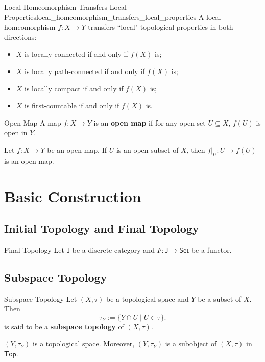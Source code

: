 \documentclass{report}
\newcommand{\Top}{\mathsf{Top}}
\begin{document}
\begin{proposition}{Local Homeomorphism Transfers Local Properties}{local_homeomorphism_transfers_local_properties}
	A local homeomorphism $f: X \rightarrow Y$ transfers ``local" topological properties in both directions:
	\begin{itemize}
		\item $X$ is locally connected if and only if $f(X)$ is;
		\item  $X$ is locally path-connected if and only if $f(X)$ is;
		\item  $X$ is locally compact if and only if $f(X)$ is;
		\item  $X$ is first-countable if and only if $f(X)$ is.
	\end{itemize}
\end{proposition}

\begin{definition}{Open Map}{}
	A map $f:X\to Y$ is an \textbf{open map} if for any open set $U\subseteq X$, $f(U)$ is open in $Y$.
\end{definition}
\begin{proposition}{}{}
	Let $f:X\to Y$ be an open map. If $U$ is an open subset of $X$, then $f|_U:U\to f(U)$ is an open map.
\end{proposition}

\section{Basic Construction}
\subsection{Initial Topology and Final Topology}
\begin{definition}{Final Topology}{}
	Let $\mathsf{J}$ be a discrete category and $F:\mathsf{J}\to\mathsf{Set}$ be a functor.
\end{definition}

\subsection{Subspace Topology}
\begin{definition}{Subspace Topology}{}
	Let $(X,\tau)$ be a topological space and $Y$ be a subset of $X$. Then
	\[
		\tau_Y:=\{Y\cap U\mid U\in \tau\}.
	\]
	is said to be a \textbf{subspace topology} of $(X,\tau)$.
\end{definition}

$(Y,\tau_Y)$ is a topological space. Moreover, $(Y,\tau_Y)$ is a subobject of $(X,\tau)$ in $\Top$.
\end{document}
